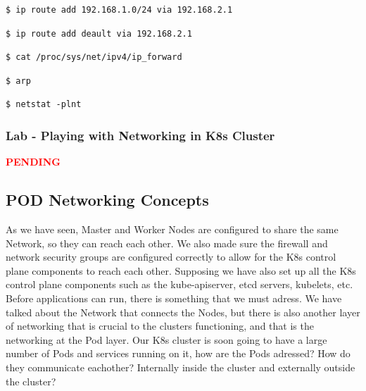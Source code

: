 \documentclass{article}
\newenvironment{codetemplate}[1][]{%
  \mybasecolorbox[#1]
  \itshape
}{%
  \endmybasecolorbox
}
\begin{document}
\begin{codetemplate}{}
\begin{verbatim}
$ ip route add 192.168.1.0/24 via 192.168.2.1
\end{verbatim}
\end{codetemplate}

\begin{codetemplate}{}
\begin{verbatim}
$ ip route add deault via 192.168.2.1
\end{verbatim}
\end{codetemplate}

\begin{codetemplate}{}
\begin{verbatim}
$ cat /proc/sys/net/ipv4/ip_forward
\end{verbatim}
\end{codetemplate}

\begin{codetemplate}{}
\begin{verbatim}
$ arp
\end{verbatim}
\end{codetemplate}

\begin{codetemplate}{}
\begin{verbatim}
$ netstat -plnt
\end{verbatim}
\end{codetemplate}

\subsubsection{Lab - Playing with Networking in K8s Cluster}

\textcolor{red}{\textbf{PENDING}}

\subsection{POD Networking Concepts}

As we have seen, Master and Worker Nodes are configured to share the same Network, so they can reach each other. We also made sure the firewall and network security groups are configured correctly to allow for the K8s control plane components to reach each other. Supposing we have also set up all the K8s control plane components such as the kube-apiserver, etcd servers, kubelets, etc. Before applications can run, there is something that we must adress. We have talked about the Network that connects the Nodes,  but there is also another layer of networking that is crucial to the clusters functioning, and that is the networking at the Pod layer. Our K8s cluster is soon going to have a large number of Pods and services running on it, how are the Pods adressed? How do they communicate eachother? Internally inside the cluster and externally outside the cluster?
\end{document}
